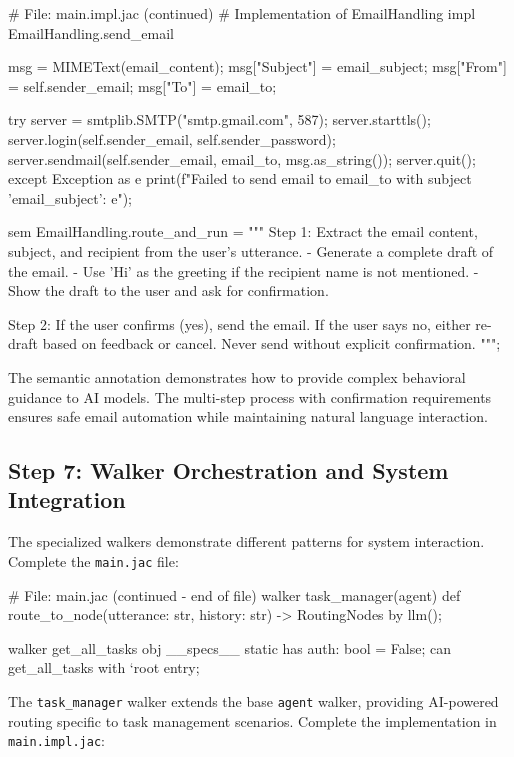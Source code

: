 \begin{jacblock}
# File: main.impl.jac (continued)
# Implementation of EmailHandling
impl EmailHandling.send_email {
    msg = MIMEText(email_content);
    msg["Subject"] = email_subject;
    msg["From"] = self.sender_email;
    msg["To"] = email_to;

    try {
        server = smtplib.SMTP("smtp.gmail.com", 587);
        server.starttls();
        server.login(self.sender_email, self.sender_password);
        server.sendmail(self.sender_email, email_to, msg.as_string());
        server.quit();
    }
    except Exception as e {
        print(f"Failed to send email to {email_to} with subject '{email_subject}': {e}");
    }
}

sem EmailHandling.route_and_run = """
Step 1: Extract the email content, subject, and recipient from the user's utterance.
- Generate a complete draft of the email.
- Use 'Hi' as the greeting if the recipient name is not mentioned.
- Show the draft to the user and ask for confirmation.

Step 2: If the user confirms (yes), send the email.
If the user says no, either re-draft based on feedback or cancel.
Never send without explicit confirmation.
""";
\end{jacblock}

The semantic annotation demonstrates how to provide complex behavioral guidance to AI models. The multi-step process with confirmation requirements ensures safe email automation while maintaining natural language interaction.

\subsection{Step 7: Walker Orchestration and System Integration}

The specialized walkers demonstrate different patterns for system interaction. Complete the \texttt{main.jac} file:

\begin{jacblock}
# File: main.jac (continued - end of file)
walker task_manager(agent) {
    def route_to_node(utterance: str, history: str) -> RoutingNodes by llm();
}

walker get_all_tasks {
    obj __specs__ {
        static has auth: bool = False;
    }
    can get_all_tasks with `root entry;
}
\end{jacblock}

The \texttt{task\_manager} walker extends the base \texttt{agent} walker, providing AI-powered routing specific to task management scenarios. Complete the implementation in \texttt{main.impl.jac}:

